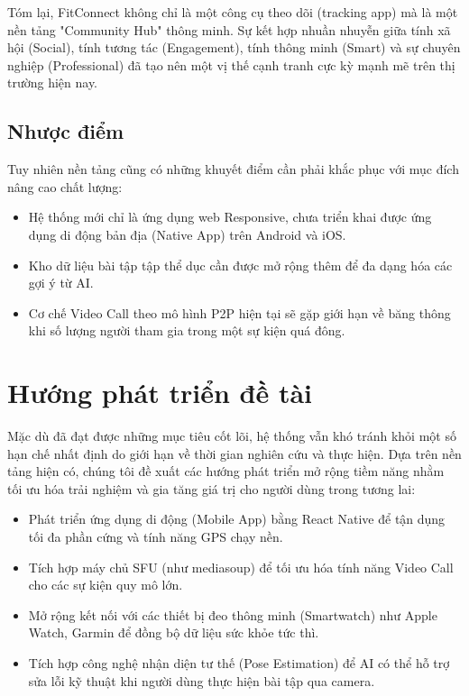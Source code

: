 Tóm lại, FitConnect không chỉ là một công cụ theo dõi (tracking app) mà là một nền tảng "Community Hub" thông minh. Sự kết hợp nhuần nhuyễn giữa tính xã hội (Social), tính tương tác (Engagement), tính thông minh (Smart) và sự chuyên nghiệp (Professional) đã tạo nên một vị thế cạnh tranh cực kỳ mạnh mẽ trên thị trường hiện nay.

\subsection{Nhược điểm}
Tuy nhiên nền tảng cũng có những khuyết điểm cần phải khắc phục với mục đích nâng cao chất lượng:
\begin{itemize}
    \item Hệ thống mới chỉ là ứng dụng web Responsive, chưa triển khai được ứng dụng di động bản địa (Native App) trên Android và iOS.
    \item Kho dữ liệu bài tập tập thể dục cần được mở rộng thêm để đa dạng hóa các gợi ý từ AI.
    \item Cơ chế Video Call theo mô hình P2P hiện tại sẽ gặp giới hạn về băng thông khi số lượng người tham gia trong một sự kiện quá đông.
\end{itemize}

\section{Hướng phát triển đề tài}
Mặc dù đã đạt được những mục tiêu cốt lõi, hệ thống vẫn khó tránh khỏi một số hạn chế nhất định do giới hạn về thời gian nghiên cứu và thực hiện. Dựa trên nền tảng hiện có, chúng tôi đề xuất các hướng phát triển mở rộng tiềm năng nhằm tối ưu hóa trải nghiệm và gia tăng giá trị cho người dùng trong tương lai:
\begin{itemize}
    \item Phát triển ứng dụng di động (Mobile App) bằng React Native để tận dụng tối đa phần cứng và tính năng GPS chạy nền.
    \item Tích hợp máy chủ SFU (như mediasoup) để tối ưu hóa tính năng Video Call cho các sự kiện quy mô lớn.
    \item Mở rộng kết nối với các thiết bị đeo thông minh (Smartwatch) như Apple Watch, Garmin để đồng bộ dữ liệu sức khỏe tức thì.
    \item Tích hợp công nghệ nhận diện tư thế (Pose Estimation) để AI có thể hỗ trợ sửa lỗi kỹ thuật khi người dùng thực hiện bài tập qua camera.

\end{itemize}
